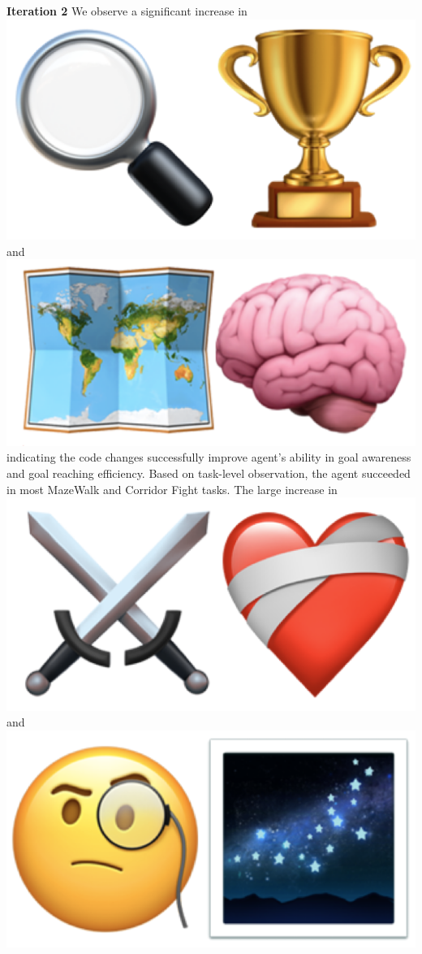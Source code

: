 \begin{flushleft}
	\textbf{Iteration 2} We observe a significant increase in
	\includegraphics[scale=0.05]{figs/emojis/mini_1.png}
	and
	\includegraphics[scale=0.05]{figs/emojis/mini_2.png}
	indicating the code changes successfully improve agent's ability in goal
	awareness and goal reaching efficiency. Based on task-level observation, the
	agent succeeded in most MazeWalk and Corridor Fight tasks. The large increase in
	\includegraphics[scale=0.05]{figs/emojis/mini_5.png}
	and
	\includegraphics[scale=0.05]{figs/emojis/mini_7.png}

\end{flushleft}
